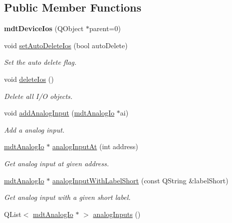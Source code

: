\subsection*{Public Member Functions}
\begin{DoxyCompactItemize}
\item 
\hypertarget{classmdt_device_ios_a44939a10d66421069bdd4b8717e2798c}{
{\bfseries mdtDeviceIos} (QObject $\ast$parent=0)}
\label{classmdt_device_ios_a44939a10d66421069bdd4b8717e2798c}

\item 
void \hyperlink{classmdt_device_ios_af771f8080ce4a7260baa0acccacae0e1}{setAutoDeleteIos} (bool autoDelete)
\begin{DoxyCompactList}\small\item\em Set the auto delete flag. \end{DoxyCompactList}\item 
void \hyperlink{classmdt_device_ios_a272fc1fa86e1b66e6af0e58b130939e0}{deleteIos} ()
\begin{DoxyCompactList}\small\item\em Delete all I/O objects. \end{DoxyCompactList}\item 
void \hyperlink{classmdt_device_ios_a0e2683630eff9410003a36ae5af76b52}{addAnalogInput} (\hyperlink{classmdt_analog_io}{mdtAnalogIo} $\ast$ai)
\begin{DoxyCompactList}\small\item\em Add a analog input. \end{DoxyCompactList}\item 
\hyperlink{classmdt_analog_io}{mdtAnalogIo} $\ast$ \hyperlink{classmdt_device_ios_a70a3d979ec5d44297e8195e37596d5bc}{analogInputAt} (int address)
\begin{DoxyCompactList}\small\item\em Get analog input at given address. \end{DoxyCompactList}\item 
\hyperlink{classmdt_analog_io}{mdtAnalogIo} $\ast$ \hyperlink{classmdt_device_ios_ae31753e23d7ab14073f852dca85c2f9e}{analogInputWithLabelShort} (const QString \&labelShort)
\begin{DoxyCompactList}\small\item\em Get analog input with a given short label. \end{DoxyCompactList}\item 
\hypertarget{classmdt_device_ios_a8635bcc71baa140b87be9edb41e5e61b}{
QList$<$ \hyperlink{classmdt_analog_io}{mdtAnalogIo} $\ast$ $>$ \hyperlink{classmdt_device_ios_a8635bcc71baa140b87be9edb41e5e61b}{analogInputs} ()}
\label{classmdt_device_ios_a8635bcc71baa140b87be9edb41e5e61b}


\end{DoxyCompactItemize}
